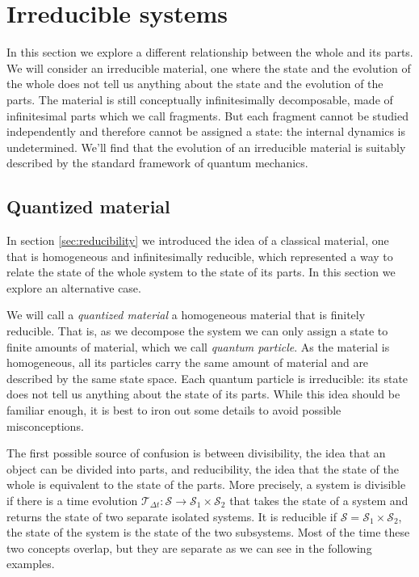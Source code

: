 \documentclass[smallextended]{svjour3}
\numberwithin{equation}{section}
\theoremstyle{definition}
\begin{document}
\section{Irreducible systems}
\label{sec:irreducibility}

In this section we explore a different relationship between the whole and its parts. We will consider an irreducible material, one where the state and the evolution of the whole does not tell us anything about the state and the evolution of the parts. The material is still conceptually infinitesimally decomposable, made of infinitesimal parts which we call fragments. But each fragment cannot be studied independently and therefore cannot be assigned a state: the internal dynamics is undetermined. We'll find that the evolution of an irreducible material is suitably described by the standard framework of quantum mechanics.

\subsection{Quantized material}

In section \ref{sec:reducibility} we introduced the idea of a classical material, one that is homogeneous and infinitesimally reducible, which represented a way to relate the state of the whole system to the state of its parts. In this section we explore an alternative case.

We will call a \emph{quantized material} a homogeneous material that is finitely reducible. That is, as we decompose the system we can only assign a state to finite amounts of material, which we call \emph{quantum particle}. As the material is homogeneous, all its particles carry the same amount of material and are described by the same state space. Each quantum particle is irreducible: its state does not tell us anything about the state of its parts. While this idea should be familiar enough, it is best to iron out some details to avoid possible misconceptions.

The first possible source of confusion is between divisibility, the idea that an object can be divided into parts, and reducibility, the idea that the state of the whole is equivalent to the state of the parts. More precisely, a system is divisible if there is a time evolution $\mathcal{T}_{\Delta t}: \mathcal{S} \rightarrow \mathcal{S}_1 \times \mathcal{S}_2$ that takes the state of a system and returns the state of two separate isolated systems. It is reducible if $\mathcal{S} = \mathcal{S}_1 \times \mathcal{S}_2$, the state of the system is the state of the two subsystems. Most of the time these two concepts overlap, but they are separate as we can see in the following examples.
\end{document}
